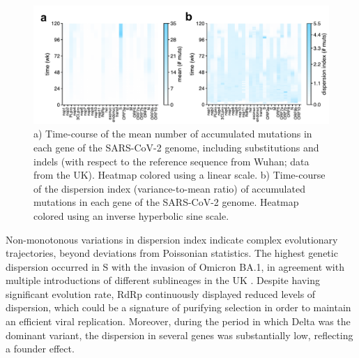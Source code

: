 \begin{figure}[ht!]
    \centering
    \includegraphics[width=\linewidth]{assets/Ch4Fig1.pdf}
    \caption{a) Time-course of the mean number of accumulated mutations in each gene of the SARS-CoV-2 genome, including substitutions and indels (with respect to the reference sequence from Wuhan; data from the UK). Heatmap colored using a linear scale. b) Time-course of the dispersion index (variance-to-mean ratio) of accumulated mutations in each gene of the SARS-CoV-2 genome. Heatmap colored using an inverse hyperbolic sine scale.}\label{fig:fig4.1}
\end{figure}

Non-monotonous variations in dispersion index indicate complex evolutionary trajectories, beyond deviations from Poissonian statistics. The highest genetic dispersion occurred in S with the invasion of Omicron BA.1, in agreement with multiple introductions of different sublineages in the UK \cite{tsui2023genomic}. Despite having significant evolution rate, RdRp continuously displayed reduced levels of dispersion, which could be a signature of purifying selection in order to maintain an efficient viral replication. Moreover, during the period in which Delta was the dominant variant, the dispersion in several genes was substantially low, reflecting a founder effect.

